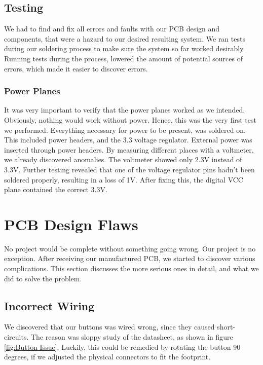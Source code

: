 \subsection{Testing}
We had to find and fix all errors and faults with our PCB design and components, that were a hazard to our desired resulting system.  
We ran tests during our soldering process to make sure the system so far worked desirably. Running tests during the process, lowered the amount of potential sources of errors, which made it easier to discover errors.

\subsubsection{Power Planes}
It was very important to verify that the power planes worked as we intended. Obviously, nothing would work without power. Hence, this was the very first test we performed.
\newline
Everything necessary for power to be present, was soldered on. This included power headers, and the 3.3 voltage regulator. External power was inserted through power headers. By measuring different places with a voltmeter, we already discovered anomalies. The voltmeter showed only 2.3V instead of 3.3V. Further testing revealed that one of the voltage regulator pins hadn't been soldered properly, resulting in a loss of 1V. After fixing this, the digital VCC plane contained the correct 3.3V.


\section{PCB Design Flaws}
No project would be complete without something going wrong. Our project is no exception. After receiving our manufactured PCB, we started to discover various complications. This section discusses the more serious ones in detail, and what we did to solve the problem.

\subsection{Incorrect Wiring}
We discovered that our buttons was wired wrong, since they caused short-circuits. The reason was sloppy study of the datasheet, as shown in figure \ref{fig:Button Issue}. Luckily, this could be remedied by rotating the button 90 degrees, if we adjusted the physical connectors to fit the footprint.

